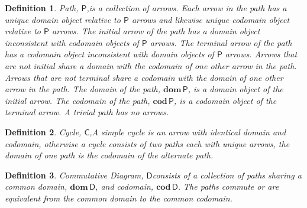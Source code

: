 \documentclass[aps,twocolumn,secnumarabic,nobalancelastpage,amsmath,amssymb,
amsthm,nofootinbib,parskip=full]{revtex4}
\numberwithin{equation}{section}
\newtheorem{definition}{Definition}[section]
\newcommand{\diag}[1]{\mathbf{\mathsf{#1}}}
\newcommand{\diagdom}[1]{\oper{dom}\diag{#1}}
\newcommand{\diagcod}[1]{\oper{cod}\diag{#1}}
\newcommand{\oper}[1]{\mathbf{#1}\,}
\begin{document}
\begin{definition}{Path, $\diag{P}$,}\label{def:path}
  is a collection of arrows.
  Each arrow in the path has a unique domain object relative to $\diag{P}$
  arrows and likewise unique codomain object relative to $\diag{P}$ arrows.
  The initial arrow of the path has a domain object inconsistent with codomain
  objects of $\diag{P}$ arrows.
  The terminal arrow of the path has a codomain object inconsistent with domain
  objects of $\diag{P}$ arrows.
  Arrows that are not initial share a domain with the codomain of one other
  arrow in the path.
  Arrows that are not terminal share a codomain with the domain of one other
  arrow in the path.
  The domain of the path, $\diagdom{P}$, is a domain object of the
  initial arrow. The codomain of the path, $\diagcod{P}$,
  is a codomain object of the terminal arrow. A trivial path has no arrows.
\end{definition}

\begin{definition}{Cycle, $\diag{C}$},\label{def:cycle}
  A simple cycle is an arrow with identical domain and codomain,
  otherwise a cycle consists of two paths each with unique arrows,
  the domain of one path is the codomain of the alternate path.
\end{definition}

\begin{definition}{Commutative Diagram, $\diag{D}$}\label{def:commutative}
  consists of a collection of paths
  sharing a common domain, $\diagdom{D}$, and codomain,
  $\diagcod{D}$. The paths commute
  or are equivalent from the common domain to the common codomain.
\end{definition}
\end{document}
